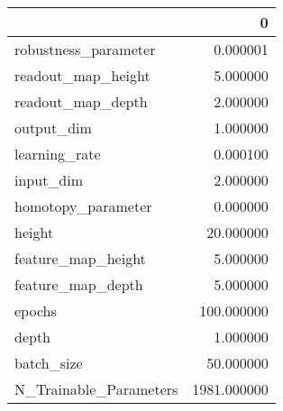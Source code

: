 \begin{tabular}{lr}
\toprule
{} &            0 \\
\midrule
robustness\_parameter   &     0.000001 \\
readout\_map\_height     &     5.000000 \\
readout\_map\_depth      &     2.000000 \\
output\_dim             &     1.000000 \\
learning\_rate          &     0.000100 \\
input\_dim              &     2.000000 \\
homotopy\_parameter     &     0.000000 \\
height                 &    20.000000 \\
feature\_map\_height     &     5.000000 \\
feature\_map\_depth      &     5.000000 \\
epochs                 &   100.000000 \\
depth                  &     1.000000 \\
batch\_size             &    50.000000 \\
N\_Trainable\_Parameters &  1981.000000 \\
\bottomrule
\end{tabular}
